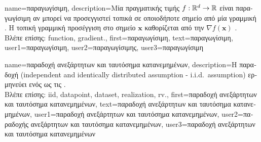 {name={\foreignlanguage{greek}{παραγωγίσιμη}},
	description={\foreignlanguage{greek}{Μία}  \foreignlanguage{greek}{πραγματικής 
		τιμής} $f: \mathbb{R}^{d} \rightarrow \mathbb{R}$ 
		\foreignlanguage{greek}{είναι παραγωγίσιμη αν μπορεί να προσεγγιστεί τοπικά σε οποιοδήποτε σημείο από μία  
		γραμμική} . \foreignlanguage{greek}{Η τοπική γραμμική προσέγγιση στο σημείο $\mathbf{x}$ καθορίζεται
		από την}  $\nabla f ( \mathbf{x})$ \cite{RudinBookPrinciplesMatheAnalysis}.\\
		\foreignlanguage{greek}{Βλέπε επίσης:} \gls{function}, \gls{gradient}.},
	first={\foreignlanguage{greek}{παραγωγίσιμη}},
	text={\foreignlanguage{greek}{παραγωγίσιμη}},
	user1={\foreignlanguage{greek}{παραγωγίσιμη}}, %
  	user2={\foreignlanguage{greek}{παραγωγίσιμης}}, %
	user3={\foreignlanguage{greek}{παραγωγίσιμη}} %
}

{name={\foreignlanguage{greek}{παραδοχή ανεξάρτητων και ταυτόσημα κατανεμημένων}}, 
	description={\foreignlanguage{greek}{Η παραδοχή}  
		(independent and identically distributed assumption - i.i.d.\ assumption) \foreignlanguage{greek}{ερμηνεύει}  
		\foreignlanguage{greek}{ενός}  \foreignlanguage{greek}{ως τις}   .\\
		\foreignlanguage{greek}{Βλέπε επίσης:} \gls{iid}, \gls{datapoint}, \gls{dataset}, \gls{realization}, \gls{rv}.},
	first={\foreignlanguage{greek}{παραδοχή ανεξάρτητων και ταυτόσημα κατανεμημένων}},
	text={\foreignlanguage{greek}{παραδοχή ανεξάρτητων και ταυτόσημα κατανεμημένων}},
	user1={\foreignlanguage{greek}{παραδοχή ανεξάρτητων και ταυτόσημα κατανεμημένων}}, %
  	user2={\foreignlanguage{greek}{παραδοχής ανεξάρτητων και ταυτόσημα κατανεμημένων}}, %
	user3={\foreignlanguage{greek}{παραδοχή ανεξάρτητων και ταυτόσημα κατανεμημένων}} %
}

